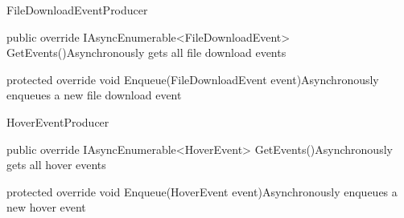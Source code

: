 \begin{class}{FileDownloadEventProducer} 
    


    \begin{methods}
        \begin{method}{public override IAsyncEnumerable<FileDownloadEvent> GetEvents()}{Asynchronously gets all file download events}
        \end{method}
        \begin{method}{protected override void Enqueue(FileDownloadEvent event)}{Asynchronously enqueues a new file download event}
            \begin{parameters}
            \end{parameters}
        \end{method}
    \end{methods}
\end{class}

\begin{class}{HoverEventProducer} 
    


    \begin{methods}
        \begin{method}{public override IAsyncEnumerable<HoverEvent> GetEvents()}{Asynchronously gets all hover events}
        \end{method}
        \begin{method}{protected override void Enqueue(HoverEvent event)}{Asynchronously enqueues a new hover event}
            \begin{parameters}
            \end{parameters}
        \end{method}
    \end{methods}
\end{class}

